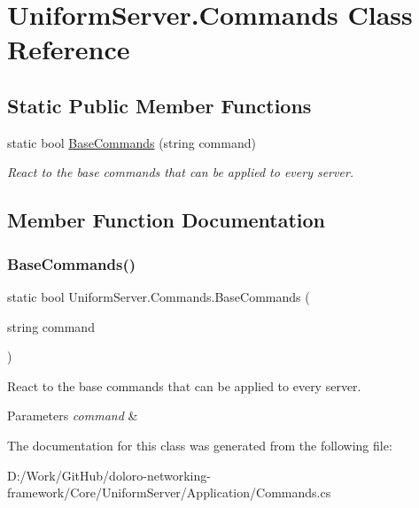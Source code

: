 \hypertarget{class_uniform_server_1_1_commands}{}\section{Uniform\+Server.\+Commands Class Reference}
\label{class_uniform_server_1_1_commands}
\subsection*{Static Public Member Functions}
\begin{DoxyCompactItemize}
\item 
static bool \mbox{\hyperlink{class_uniform_server_1_1_commands_ad1bac97da40d03e97f9b5fe7ed152ef9}{Base\+Commands}} (string command)
\begin{DoxyCompactList}\small\item\em React to the base commands that can be applied to every server. \end{DoxyCompactList}\end{DoxyCompactItemize}


\subsection{Member Function Documentation}
\mbox{\label{class_uniform_server_1_1_commands_ad1bac97da40d03e97f9b5fe7ed152ef9}} 
\subsubsection{\texorpdfstring{Base\+Commands()}{BaseCommands()}}
{\footnotesize\ttfamily static bool Uniform\+Server.\+Commands.\+Base\+Commands (\begin{DoxyParamCaption}\item[{string}]{command }\end{DoxyParamCaption})\hspace{0.3cm}{\ttfamily [static]}}



React to the base commands that can be applied to every server. 


\begin{DoxyParams}{Parameters}
{\em command} & \\
\hline
\end{DoxyParams}


The documentation for this class was generated from the following file\+:\begin{DoxyCompactItemize}
\item 
D\+:/\+Work/\+Git\+Hub/doloro-\/networking-\/framework/\+Core/\+Uniform\+Server/\+Application/Commands.\+cs\end{DoxyCompactItemize}
